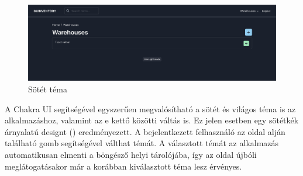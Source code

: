 \begin{figure}[!ht]
  \centering
  \includegraphics[width=150mm, keepaspectratio]{figures/dark_mode.png}
  \caption{Sötét téma}
  \label{fig:darkMode}
\end{figure}
A Chakra UI segítségével egyszerűen megvalósítható a sötét és világos téma is az alkalmazáshoz, valamint az e kettő közötti váltás is.
Ez jelen esetben egy sötétkék árnyalatú designt () eredményezett. 
A bejelentkezett felhasználó az oldal alján található gomb segítségével válthat témát.
A választott témát az alkalmazás automatikusan elmenti a böngésző helyi tárolójába, így az oldal újbóli meglátogatásakor már a korábban kiválasztott téma lesz érvényes.


